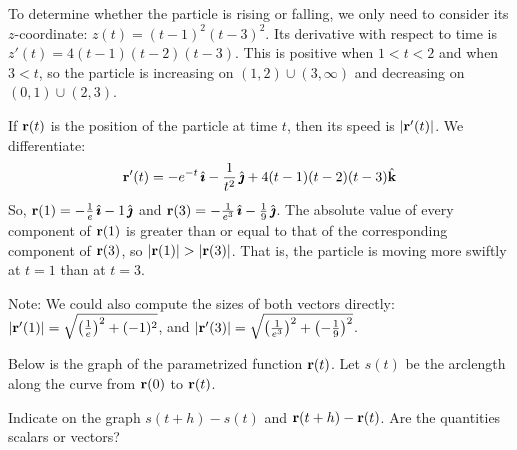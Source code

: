 \begin{solution}
To determine whether the particle is rising or falling, we only need to consider its $z$-coordinate: $z(t)=(t-1)^2(t-3)^2$. Its derivative with respect to time is $z'(t)=4(t-1)(t-2)(t-3)$. This is positive when $1<t<2$ and when $3<t$, so the particle is increasing on $(1,2) \cup (3,\infty)$ and decreasing on $(0,1) \cup (2,3)$.

If $\mathbf{r}(t)$ is the position of the particle at time $t$, then its speed is $|\mathbf{r}'(t)|$. We differentiate:
\[\mathbf{r}'(t)=-e^{-t}\,\hat{\pmb{\imath}}-\frac{1}{t^2}\,\hat{\pmb{\jmath}}+4(t-1)(t-2)(t-3)\hat{\mathbf{k}}\]
So, $\mathbf{r}(1)=-\frac{1}{e}\,\hat{\pmb{\imath}}-1\,\hat{\pmb{\jmath}}$ and $\mathbf{r}(3)=-\frac{1}{e^3}\,\hat{\pmb{\imath}}-\frac{1}{9}\,\hat{\pmb{\jmath}}$. The absolute value of every component of $\mathbf{r}(1)$ is greater than or equal to that of the corresponding component of $\mathbf{r}(3)$, so $|\vr(1)|>|\vr(3)|$. That is, the particle is moving more swiftly at $t=1$ than at $t=3$.

Note: We could also compute the sizes of both vectors directly: $|\mathbf{r}'(1)|=\sqrt{\left(\frac{1}{e}\right)^2+(-1)^2}$, and $|\mathbf{r}'(3)|=\sqrt{\left(\frac{1}{e^3}\right)^2+\left(-\frac{1}{9}\right)^2}$.
\end{solution}
\begin{question}
Below is the graph of the parametrized function $\mathbf{r}(t)$. Let $s(t)$ be the arclength along the curve from $\mathbf{r}(0)$ to $\mathbf{r}(t)$.

\begin{center}
\end{center}
Indicate on the graph $s(t+h)-s(t)$ and $\mathbf{r}(t+h)-\mathbf{r}(t)$. Are the quantities scalars or vectors?


\end{question}
